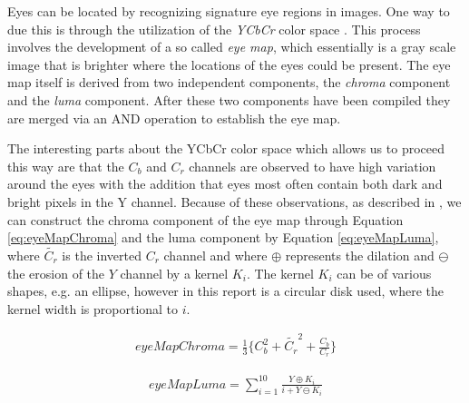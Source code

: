 Eyes can be located by recognizing signature eye regions in images. One way to due this is through the utilization of the \textit{YCbCr} color space \cite{fdInColorImages}. This process involves the development of a so called \textit{eye map}, which essentially is a gray scale image that is brighter where the locations of the eyes could be present. The eye map itself is derived from two independent components, the \textit{chroma} component and the \textit{luma} component. After these two components have been compiled they are merged via an AND operation to establish the eye map. 

The interesting parts about the YCbCr color space which allows us to proceed this way are that the $C_{b}$ and $C_{r}$ channels are observed to have high variation around the eyes with the addition that eyes most often contain both dark and bright pixels in the Y channel. Because of these observations, as described in \cite{fdInColorImages}, we can construct  the chroma component of the eye map through Equation \ref{eq:eyeMapChroma} and the luma component by Equation \ref{eq:eyeMapLuma}, where $\tilde{C_r}$ is the inverted $C_r$ channel and where $\oplus$ represents the dilation and $\ominus$ the erosion of the $Y$ channel by a kernel $K_{i}$. The kernel $K_{i}$ can be of various shapes, e.g. an ellipse, however in this report is a circular disk used, where the kernel width is proportional to $i$.

\begin{equation} \label{eq:eyeMapChroma}
\begin{split}
eyeMapChroma = \frac{1}{3} \lbrace C_b^2 + \tilde{C_r}^2 + \frac{C_b}{C_r} \rbrace
\end{split}
\end{equation}

\begin{equation} \label{eq:eyeMapLuma}
\begin{split}
  eyeMapLuma = \sum_{i=1}^{10}\frac{Y\oplus K_{i}}{i + Y\ominus  K_{i}}
\end{split}
\end{equation}








